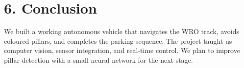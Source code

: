 \documentclass[11pt,a4paper]{article}
\begin{document}
\section*{6. Conclusion}

We built a working autonomous vehicle that navigates the WRO track, avoids coloured pillars, and completes the parking sequence. The project taught us computer vision, sensor integration, and real-time control. We plan to improve pillar detection with a small neural network for the next stage.
\end{document}
